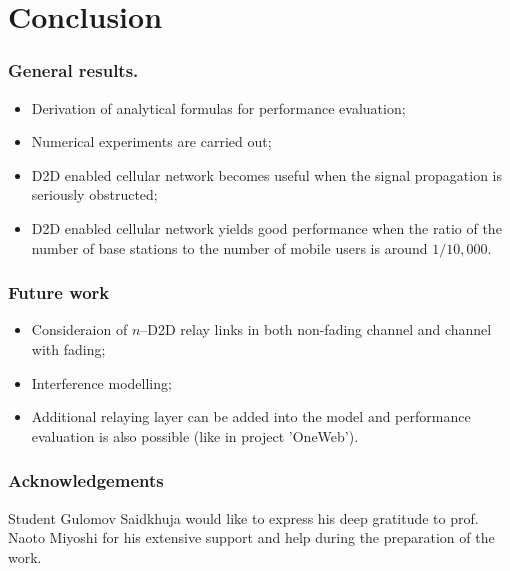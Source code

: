 \section{Conclusion}

\begin {frame}
\frametitle{General results.}
\begin{itemize}
  \item Derivation of analytical formulas for performance evaluation;
  \item Numerical experiments are carried out;
  \item D2D enabled cellular network becomes useful when the signal propagation is seriously obstructed;
  \item D2D enabled cellular network yields good performance when the ratio of the number of base stations to the number of mobile users is around \(1/10,000\).
\end{itemize}
\end {frame}

\begin{frame}
\frametitle{Future work}
\begin{itemize}
  \item Consideraion of \(n\)--D2D relay links in both non-fading channel and channel with fading;
  \item Interference modelling;
  \item Additional relaying layer can be added into the model and performance evaluation is also possible (like in project 'OneWeb').
\end{itemize}
\end{frame}

\begin{frame}
\frametitle{Acknowledgements}
Student Gulomov Saidkhuja would like to express his deep gratitude to prof. Naoto Miyoshi for his extensive support and help during the preparation of the work.
\end{frame}
